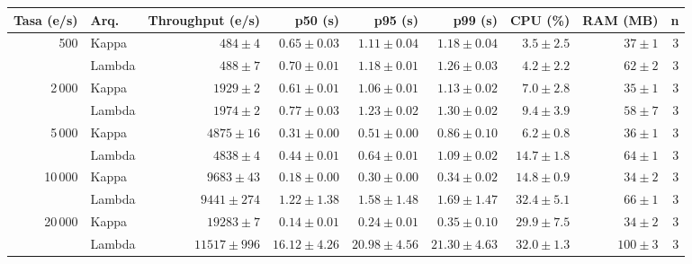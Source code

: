 \begin{tabular}{rlrrrrrrr}
\toprule
Tasa (e/s) & Arq. & Throughput (e/s) & p50 (s) & p95 (s) & p99 (s) & CPU (\%) & RAM (MB) & n \\
\midrule
500 & Kappa & $484\pm4$ & $0.65\pm0.03$ & $1.11\pm0.04$ & $1.18\pm0.04$ & $3.5\pm2.5$ & $37\pm1$ & 3 \\
 & Lambda & $488\pm7$ & $0.70\pm0.01$ & $1.18\pm0.01$ & $1.26\pm0.03$ & $4.2\pm2.2$ & $62\pm2$ & 3 \\
\midrule
2\,000 & Kappa & $1929\pm2$ & $0.61\pm0.01$ & $1.06\pm0.01$ & $1.13\pm0.02$ & $7.0\pm2.8$ & $35\pm1$ & 3 \\
 & Lambda & $1974\pm2$ & $0.77\pm0.03$ & $1.23\pm0.02$ & $1.30\pm0.02$ & $9.4\pm3.9$ & $58\pm7$ & 3 \\
\midrule
5\,000 & Kappa & $4875\pm16$ & $0.31\pm0.00$ & $0.51\pm0.00$ & $0.86\pm0.10$ & $6.2\pm0.8$ & $36\pm1$ & 3 \\
 & Lambda & $4838\pm4$ & $0.44\pm0.01$ & $0.64\pm0.01$ & $1.09\pm0.02$ & $14.7\pm1.8$ & $64\pm1$ & 3 \\
\midrule
10\,000 & Kappa & $9683\pm43$ & $0.18\pm0.00$ & $0.30\pm0.00$ & $0.34\pm0.02$ & $14.8\pm0.9$ & $34\pm2$ & 3 \\
 & Lambda & $9441\pm274$ & $1.22\pm1.38$ & $1.58\pm1.48$ & $1.69\pm1.47$ & $32.4\pm5.1$ & $66\pm1$ & 3 \\
\midrule
20\,000 & Kappa & $19283\pm7$ & $0.14\pm0.01$ & $0.24\pm0.01$ & $0.35\pm0.10$ & $29.9\pm7.5$ & $34\pm2$ & 3 \\
 & Lambda & $11517\pm996$ & $16.12\pm4.26$ & $20.98\pm4.56$ & $21.30\pm4.63$ & $32.0\pm1.3$ & $100\pm3$ & 3 \\
\bottomrule
\end{tabular}